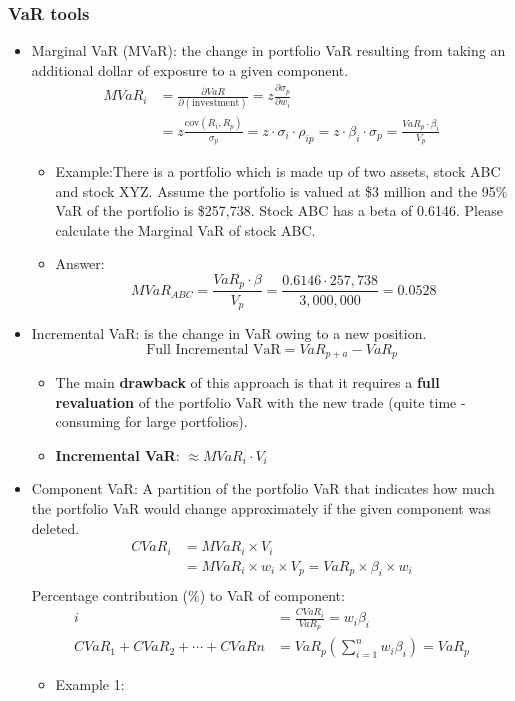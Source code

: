 \subsubsection{VaR tools}
\begin{itemize}
\item Marginal VaR (MVaR): the change in portfolio VaR resulting from taking an additional dollar of exposure to a given component.
    \begin{align*}
    MVaR_i &= \frac{\partial VaR}{\partial (\text{investment})} = z \frac{\partial \sigma_p}{\partial w_i} \\
    &= z \frac{\text{cov}(R_i, R_p)}{\sigma_p} = z \cdot \sigma_i \cdot \rho_{ip} = z \cdot \beta_i \cdot \sigma_p = \frac{VaR_p \cdot \beta_i}{V_p}
    \end{align*}
    \begin{itemize}
    \item Example:There is a portfolio which is made up of two assets, stock ABC and stock XYZ. Assume the portfolio is valued at \$3 million and the 95\% VaR of the portfolio is \$257,738. Stock ABC has a beta of 0.6146. Please calculate the Marginal VaR of stock ABC.
    \item Answer:
    \[
MVaR_{ABC} = \frac{VaR_p \cdot \beta}{V_p} = \dfrac{0.6146 \cdot 257,738}{3,000,000} = 0.0528
\]
    \end{itemize}
    

\item Incremental VaR: is the change in VaR owing to a new position.
\[
\text{Full Incremental VaR} = VaR_{p + a} - VaR_p
\]
    \begin{itemize}
        \item The main \textbf{drawback} of this approach is that it requires a \textbf{full revaluation} of the portfolio VaR with the new trade (quite time - consuming for large portfolios).
        \item \textbf{Incremental VaR}: $\approx MVaR_i \cdot V_i$
    \end{itemize}
\item Component VaR: A partition of the portfolio VaR that indicates how much the portfolio VaR would change approximately if the given component was deleted.
\begin{align*}
    CVaR_i &= MVaR_i \times V_i \\
    &= MVaR_i \times w_i \times V_p = VaR_p \times \beta_i \times w_i \\
    \end{align*}
    Percentage contribution (\%) to VaR of component:
    \begin{align*}
    i &= \frac{CVaR_i}{VaR_p} = w_i \beta_i \\
    CVaR_1 + CVaR_2 + \cdots + CVaRn &= VaR_p \left( \sum_{i = 1}^{n} w_i \beta_i \right) = VaR_p
    \end{align*}
    \begin{itemize}
    \item Example 1:
    

\end{itemize}
\end{itemize}
